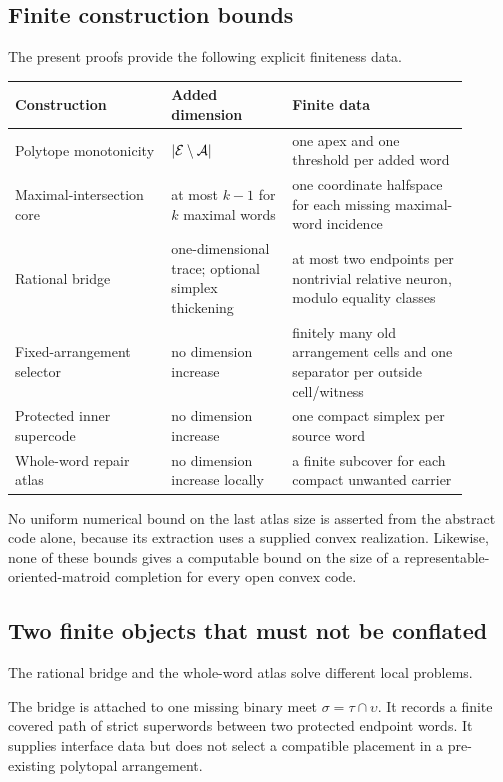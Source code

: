 \subsection{Finite construction bounds}

The present proofs provide the following explicit finiteness data.
\begin{center}
\begin{tabular}{p{0.31\linewidth}p{0.24\linewidth}p{0.35\linewidth}}
\toprule
Construction & Added dimension & Finite data\\
\midrule
Polytope monotonicity & $|\mathcal E\setminus\mathcal A|$ & one apex and one threshold per added word\\
Maximal-intersection core & at most $k-1$ for $k$ maximal words & one coordinate halfspace for each missing maximal-word incidence\\
Rational bridge & one-dimensional trace; optional simplex thickening & at most two endpoints per nontrivial relative neuron, modulo equality classes\\
Fixed-arrangement selector & no dimension increase & finitely many old arrangement cells and one separator per outside cell/witness\\
Protected inner supercode & no dimension increase & one compact simplex per source word\\
Whole-word repair atlas & no dimension increase locally & a finite subcover for each compact unwanted carrier\\
\bottomrule
\end{tabular}
\end{center}
No uniform numerical bound on the last atlas size is asserted from the abstract code alone, because its extraction uses a supplied convex realization.  Likewise, none of these bounds gives a computable bound on the size of a representable-oriented-matroid completion for every open convex code.

\subsection{Two finite objects that must not be conflated}

The rational bridge and the whole-word atlas solve different local problems.

The bridge is attached to one missing binary meet $\sigma=\tau\cap\upsilon$.  It records a finite covered path of strict superwords between two protected endpoint words.  It supplies interface data but does not select a compatible placement in a pre-existing polytopal arrangement.

